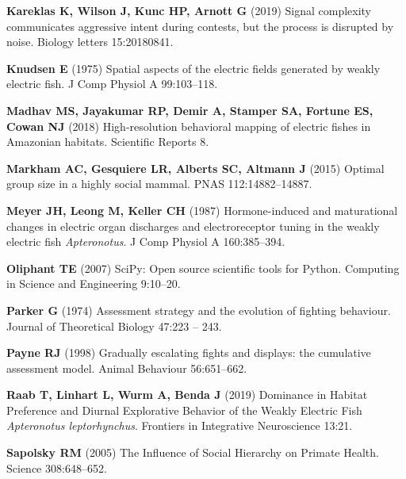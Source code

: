 \documentclass[vruler,JEB]{COB}%
\begin{document}
\begin{thebibliography}{70}
\textbf{Kareklas K, Wilson J, Kunc HP, Arnott G} (2019) Signal complexity communicates
  aggressive intent during contests, but the process is disrupted by noise.
 Biology letters 15:20180841.

\textbf{Knudsen E} (1975) Spatial aspects of the electric fields generated by weakly
  electric fish.
 J Comp Physiol A 99:103--118.

\textbf{Madhav MS, Jayakumar RP, Demir A, Stamper SA, Fortune ES, Cowan NJ} (2018)
  High-resolution behavioral mapping of electric fishes in Amazonian habitats.
 Scientific Reports 8.

\textbf{Markham AC, Gesquiere LR, Alberts SC, Altmann J} (2015) Optimal group size in a
  highly social mammal.
 PNAS 112:14882--14887.

\textbf{Meyer JH, Leong M, Keller CH} (1987) Hormone-induced and maturational changes in
  electric organ discharges and electroreceptor tuning in the weakly electric
  fish \textit{Apteronotus}.
 J Comp Physiol A 160:385--394.

\textbf{Oliphant TE} (2007) SciPy: Open source scientific tools for Python.
 Computing in Science and Engineering 9:10--20.

\textbf{Parker G} (1974) Assessment strategy and the evolution of fighting behaviour.
 Journal of Theoretical Biology 47:223 -- 243.

\textbf{Payne RJ} (1998) Gradually escalating fights and displays: the cumulative
  assessment model.
 Animal Behaviour 56:651--662.

\textbf{Raab T, Linhart L, Wurm A, Benda J} (2019) Dominance in Habitat Preference and
  Diurnal Explorative Behavior of the Weakly Electric Fish \textit{Apteronotus
  leptorhynchus}.
 Frontiers in Integrative Neuroscience 13:21.

\textbf{Sapolsky RM} (2005) The Influence of Social Hierarchy on Primate Health.
 Science 308:648--652.


\end{thebibliography}
\end{document}
